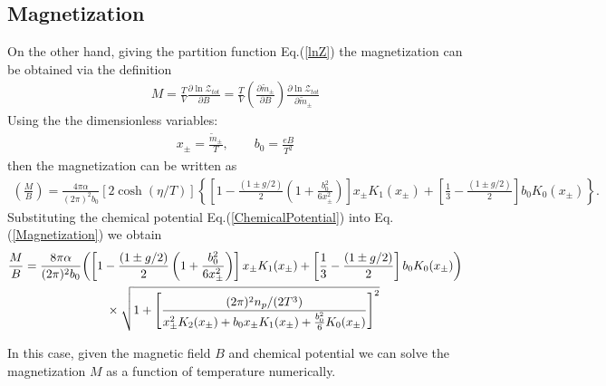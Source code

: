 \documentclass[Universe,article,submit,moreauthors,pdftex]{Definitions/mdpi}
\begin{document}
\subsection{Magnetization}
On the other hand, giving the partition function Eq.(\ref{lnZ}) the magnetization can be obtained via the definition
\begin{align}
M=\frac{T}{V}\frac{\partial \ln\mathcal{Z}_{tot}}{\partial B}=\frac{T}{V}\left(\frac{\partial\tilde m_\pm}{\partial B}\right)\frac{\partial \ln\mathcal{Z}_{tot}}{\partial\tilde m_\pm}
\end{align}
Using the the dimensionless variables:
\begin{align}
x_\pm=\frac{\tilde m_\pm}{T},\qquad b_0=\frac{eB}{T^2}
\end{align}
then the magnetization can be written as
\begin{align}\label{Magnetization}
\left(\frac{M}{B}\right)=\frac{4\pi\alpha}{(2\pi)^2b_0}\left[2\cosh(\eta/T)\right]\left\{\left[1-\frac{(1\pm g/2)}{2}\left(1+\frac{b^2_0}{6x^2_\pm}\right)\right]x_\pm K_1(x_\pm)+\left[\frac{1}{3}-\frac{(1\pm g/2)}{2}\right]b_0K_0(x_\pm)\right\}.
\end{align}
Substituting the chemical potential Eq.(\ref{ChemicalPotential}) into Eq.(\ref{Magnetization}) we obtain
\begin{align}
\frac{M}{B}=\frac{8\pi\alpha}{(2\pi)^2b_0}&{\left(\left[1-\frac{(1\pm g/2)}{2}\left(1+\frac{b^2_0}{6x^2_\pm}\right)\right]x_\pm K_1(x_\pm)+\left[\frac{1}{3}-\frac{(1\pm g/2)}{2}\right]b_0K_0(x_\pm)\right)}\notag\\
&\qquad\times\sqrt{1+\left[\frac{{(2\pi)^2n_p}/{(2T^3)}}{x_\pm^2K_2(x_\pm)+b_0x_\pm K_1(x_\pm)+\frac{b^2_0}{6}K_0(x_\pm)}\right]^2}
\end{align}


In this case, given the magnetic field $B$ and chemical potential we can solve the magnetization $M$ as a function of temperature numerically.



\end{document}
